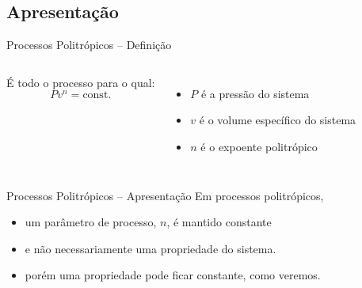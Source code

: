 \subsection{Apresentação}

    \begin{frame}{Processos Politrópicos -- Definição}\vspace*{-2em}
        \begin{columns}
        É todo o processo para o qual:
        $$Pv^n = \mbox{const.}$$
         \\[\bigskipamount]
        \begin{itemize}
            \item<2-> $P$ é a pressão do sistema \\[\bigskipamount]
            \item<3-> $v$ é o volume específico do sistema \\[\bigskipamount]
            \item<4-> $n$ é o \alert{expoente politrópico}
        \end{itemize}
        \end{columns}
    \end{frame}

    \begin{frame}{Processos Politrópicos -- Apresentação}\vspace*{-2em}
        Em processos politrópicos, \\[\medskipamount]
        \begin{itemize}
            \item<1-> um \alert{parâmetro} de processo, \alert{$n$}, é mantido constante
                \\[\medskipamount]
            \item<2-> e não \alert{necessariamente} uma \alert{propriedade} do sistema.
                \\[\medskipamount]
            \item<3-> porém uma propriedade \alert{pode} ficar constante, como veremos.
                \\[\bigskipamount]
        \end{itemize}
    \end{frame}


